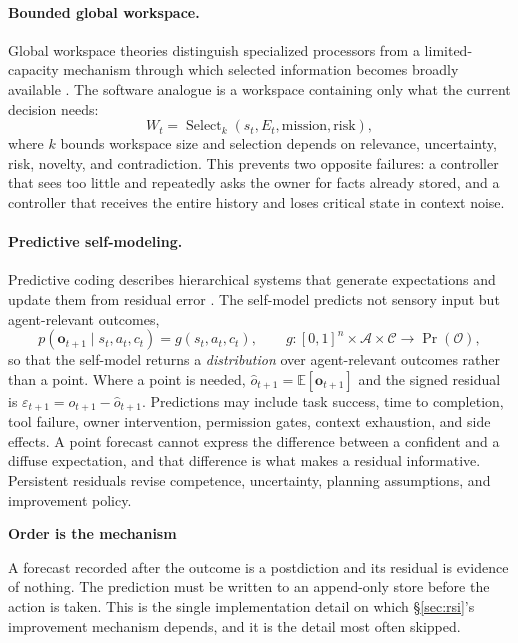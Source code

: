\documentclass[11pt]{article}
\newcommand{\op}[1]{\operatorname{#1}}
\newenvironment{claimbox}[1]{%
  \begin{shaded}\noindent\textbf{#1}\par\smallskip}{%
  \end{shaded}}
\begin{document}
\paragraph{Bounded global workspace.} Global workspace theories distinguish specialized processors from a limited-capacity mechanism through which selected information becomes broadly available \citep{dehaene1998workspace,dehaene2011conscious}. The software analogue is a workspace containing only what the current decision needs:
\begin{equation}
W_t = \op{Select}_k(s_t, E_t, \text{mission}, \text{risk}),
\label{eq:workspace}
\end{equation}
where $k$ bounds workspace size and selection depends on relevance, uncertainty, risk, novelty, and contradiction. This prevents two opposite failures: a controller that sees too little and repeatedly asks the owner for facts already stored, and a controller that receives the entire history and loses critical state in context noise.

\paragraph{Predictive self-modeling.} Predictive coding describes hierarchical systems that generate expectations and update them from residual error \citep{rao1999predictive,friston2010freeenergy}. The self-model predicts not sensory input but agent-relevant outcomes,
\begin{equation}
p(\mathbf{o}_{t+1} \mid s_t, a_t, c_t) = g(s_t, a_t, c_t),
\qquad
g : [0,1]^n \times \mathcal{A} \times \mathcal{C} \rightarrow \Pr(\mathcal{O}),
\label{eq:predict}
\end{equation}
so that the self-model returns a \emph{distribution} over agent-relevant outcomes rather than a point. Where a point is needed, $\hat{o}_{t+1} = \mathbb{E}[\mathbf{o}_{t+1}]$ and the signed residual is $\varepsilon_{t+1} = o_{t+1} - \hat{o}_{t+1}$. Predictions may include task success, time to completion, tool failure, owner intervention, permission gates, context exhaustion, and side effects. A point forecast cannot express the difference between a confident and a diffuse expectation, and that difference is what makes a residual informative. Persistent residuals revise competence, uncertainty, planning assumptions, and improvement policy.

\begin{claimbox}{Order is the mechanism}
A forecast recorded after the outcome is a postdiction and its residual is evidence of nothing. The prediction must be written to an append-only store before the action is taken. This is the single implementation detail on which \S\ref{sec:rsi}'s improvement mechanism depends, and it is the detail most often skipped.
\end{claimbox}
\end{document}
